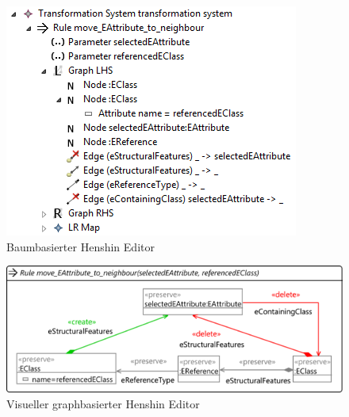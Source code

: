 \begin{figure}[h!]
  \centering
  \includegraphics[scale=1.0]{images/henshin_tree.png}
  \caption{Baumbasierter Henshin Editor}
  \label{fig:henshin_tree}
\end{figure}

\begin{figure}[h!]
  \centering
  \includegraphics[width=1.0\textwidth]{images/henshin_rule.png}
  \caption{Visueller graphbasierter Henshin Editor}
  \label{fig:henshin_rule}
\end{figure}